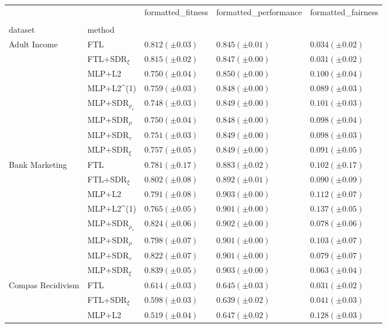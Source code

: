 \begin{tabular}{lllll}
\toprule
 &  & formatted_fitness & formatted_performance & formatted_fairness \\
 &  &  &  &  \\
dataset & method &  &  &  \\
\midrule
\multirow[t]{8}{*}{Adult Income} & FTL & $0.812 (\pm0.03)$ & $0.845 (\pm0.01)$ & $0.034 (\pm0.02)$ \\
 & FTL+SDR$_{\xi}$ & $0.815 (\pm0.02)$ & $0.847 (\pm0.00)$ & $0.031 (\pm0.02)$ \\
 & MLP+L2 & $0.750 (\pm0.04)$ & $0.850 (\pm0.00)$ & $0.100 (\pm0.04)$ \\
 & MLP+L2^{(1)} & $0.759 (\pm0.03)$ & $0.848 (\pm0.00)$ & $0.089 (\pm0.03)$ \\
 & MLP+SDR$_{\rho_s}$ & $0.748 (\pm0.03)$ & $0.849 (\pm0.00)$ & $0.101 (\pm0.03)$ \\
 & MLP+SDR$_{\rho}$ & $0.750 (\pm0.04)$ & $0.848 (\pm0.00)$ & $0.098 (\pm0.04)$ \\
 & MLP+SDR$_{\tau}$ & $0.751 (\pm0.03)$ & $0.849 (\pm0.00)$ & $0.098 (\pm0.03)$ \\
 & MLP+SDR$_{\xi}$ & $0.757 (\pm0.05)$ & $0.849 (\pm0.00)$ & $0.091 (\pm0.05)$ \\
\cline{1-5}
\multirow[t]{8}{*}{Bank Marketing} & FTL & $0.781 (\pm0.17)$ & $0.883 (\pm0.02)$ & $0.102 (\pm0.17)$ \\
 & FTL+SDR$_{\xi}$ & $0.802 (\pm0.08)$ & $0.892 (\pm0.01)$ & $0.090 (\pm0.09)$ \\
 & MLP+L2 & $0.791 (\pm0.08)$ & $0.903 (\pm0.00)$ & $0.112 (\pm0.07)$ \\
 & MLP+L2^{(1)} & $0.765 (\pm0.05)$ & $0.901 (\pm0.00)$ & $0.137 (\pm0.05)$ \\
 & MLP+SDR$_{\rho_s}$ & $0.824 (\pm0.06)$ & $0.902 (\pm0.00)$ & $0.078 (\pm0.06)$ \\
 & MLP+SDR$_{\rho}$ & $0.798 (\pm0.07)$ & $0.901 (\pm0.00)$ & $0.103 (\pm0.07)$ \\
 & MLP+SDR$_{\tau}$ & $0.822 (\pm0.07)$ & $0.901 (\pm0.00)$ & $0.079 (\pm0.07)$ \\
 & MLP+SDR$_{\xi}$ & $0.839 (\pm0.05)$ & $0.903 (\pm0.00)$ & $0.063 (\pm0.04)$ \\
\cline{1-5}
\multirow[t]{8}{*}{Compas Recidivism} & FTL & $0.614 (\pm0.03)$ & $0.645 (\pm0.03)$ & $0.031 (\pm0.02)$ \\
 & FTL+SDR$_{\xi}$ & $0.598 (\pm0.03)$ & $0.639 (\pm0.02)$ & $0.041 (\pm0.03)$ \\
 & MLP+L2 & $0.519 (\pm0.04)$ & $0.647 (\pm0.02)$ & $0.128 (\pm0.03)$ \\

\end{tabular}

